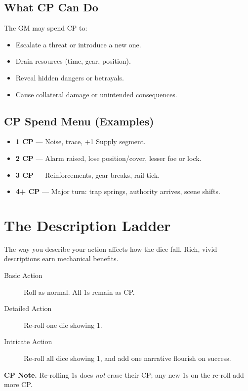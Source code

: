 \subsection*{What CP Can Do}

The GM may spend CP to:
\begin{itemize}
  \item Escalate a threat or introduce a new one.
  \item Drain resources (time, gear, position).
  \item Reveal hidden dangers or betrayals.
  \item Cause collateral damage or unintended consequences.
\end{itemize}

\subsection*{CP Spend Menu (Examples)}

\begin{itemize}
  \item \textbf{1 CP} — Noise, trace, +1 Supply segment.
  \item \textbf{2 CP} — Alarm raised, lose position/cover, lesser foe or lock.
  \item \textbf{3 CP} — Reinforcements, gear breaks, rail tick.
  \item \textbf{4+ CP} — Major turn: trap springs, authority arrives, scene shifts.
\end{itemize}

\section{The Description Ladder}

The way you describe your action affects how the dice fall. Rich, vivid descriptions earn mechanical benefits.

\begin{description}
  \item[Basic Action] Roll as normal. All 1s remain as CP.
  \item[Detailed Action] Re-roll one die showing 1.
  \item[Intricate Action] Re-roll all dice showing 1, and add one narrative flourish on success.
\end{description}

\noindent\textbf{CP Note.} Re-rolling 1s does \emph{not} erase their CP; any new 1s on the re-roll add more CP.

